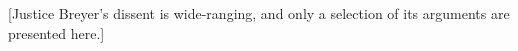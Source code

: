 %
%
%

[Justice Breyer's dissent is wide-ranging, and only a selection of its arguments
are presented here.]

